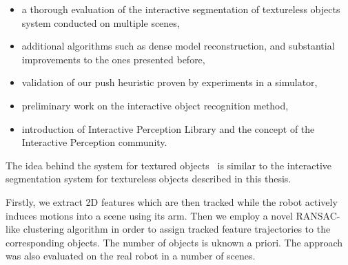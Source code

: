 \begin{itemize} 
\item a thorough evaluation of the interactive segmentation of textureless objects system conducted on multiple scenes, 
\item additional algorithms such as dense model reconstruction, and substantial improvements to the ones presented before, 
\item validation of our push heuristic proven by experiments in a simulator,
\item preliminary work on the interactive object recognition method, 
\item introduction of Interactive Perception Library and the concept of the Interactive Perception community. 
\end{itemize} 



%
%
%

%

The idea behind the system for textured objects~\cite{bersch12interactive} is similar to the interactive segmentation system for textureless objects described in this thesis.

Firstly, we extract 2D features which are then tracked while the robot actively induces
motions into a scene using its arm. Then we employ a novel RANSAC-like clustering algorithm in order to assign tracked feature trajectories to the corresponding objects. The number of objects is uknown a priori. The approach was also evaluated on the real robot in a number of scenes.
%

